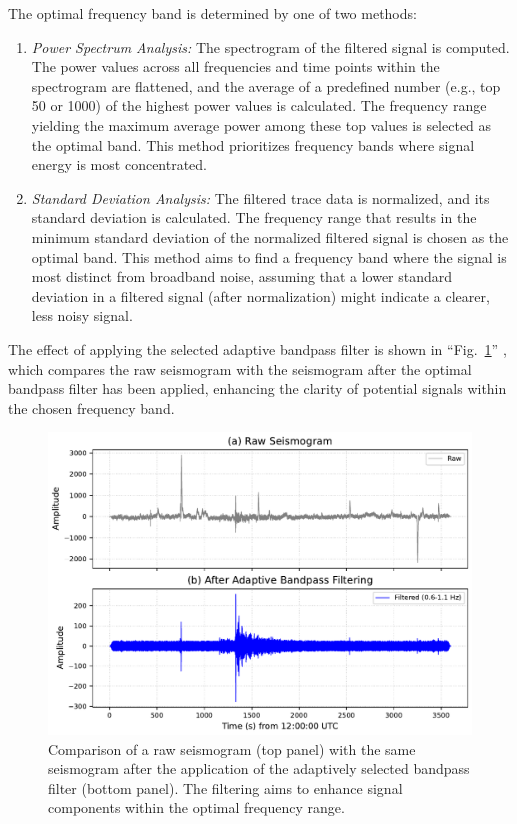 \documentclass[conference]{IEEEtran}
\begin{document}
            The optimal frequency band is determined by one of two methods:
            
            \begin{enumerate}[label=\alph*), leftmargin=3em]
                \item \textit{Power Spectrum Analysis:} The spectrogram of the filtered signal is computed.
                The power values across all frequencies and time points within the spectrogram are flattened, and the average of
                a predefined number (e.g., top 50 or 1000) of the highest power values is calculated. The frequency range
                yielding the maximum average power among these top values is selected as the optimal band. This method
                prioritizes frequency bands where signal energy is most concentrated.
                \item \textit{Standard Deviation Analysis:} The filtered trace data is normalized, and its
                standard deviation is calculated. The frequency range that results in the minimum standard deviation of the
                normalized filtered signal is chosen as the optimal band. This method aims to find a frequency band where the
                signal is most distinct from broadband noise, assuming that a lower standard deviation in a filtered signal
                (after normalization) might indicate a clearer, less noisy signal.
            \end{enumerate}

            The effect of applying the selected adaptive bandpass filter is shown in ``Fig.~\ref{fig:adaptive_filtering_comparison}''
            , which compares the raw seismogram with the seismogram after the optimal bandpass filter has been applied, 
            enhancing the clarity of potential signals within the chosen frequency band.
            \begin{figure}[htbp]
                \centerline{\includegraphics[width=0.9\columnwidth]{figures/fig2_adaptive_bandpass.pdf}}
                \caption{Comparison of a raw seismogram (top panel) with the same seismogram after the application 
                of the adaptively selected bandpass filter (bottom panel). The filtering aims to enhance signal 
                components within the optimal frequency range.}
                \label{fig:adaptive_filtering_comparison} 
            \end{figure}
\end{document}
